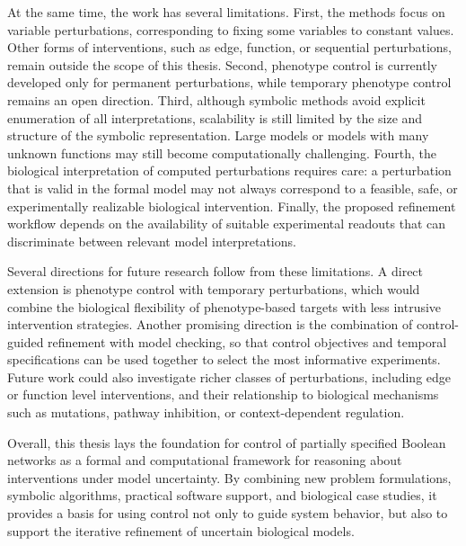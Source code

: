 At the same time, the work has several limitations. First, the methods focus
on variable perturbations, corresponding to fixing some variables to
constant values. Other forms of interventions, such as edge,
function, or sequential perturbations, remain outside the
scope of this thesis. Second, phenotype control is currently developed only
for permanent perturbations, while temporary phenotype control remains an
open direction. Third, although symbolic methods avoid explicit enumeration
of all interpretations, scalability is still limited by the size and structure of
the symbolic representation. Large models or models with many unknown
functions may still become computationally challenging. Fourth, the
biological interpretation of computed perturbations requires care: a
perturbation that is valid in the formal model may not always correspond to
a feasible, safe, or experimentally realizable biological intervention. Finally,
the proposed refinement workflow depends on the availability of suitable
experimental readouts that can discriminate between relevant model
interpretations.

Several directions for future research follow from these limitations. A direct
extension is phenotype control with temporary perturbations, which would
combine the biological flexibility of phenotype-based targets with less
intrusive intervention strategies. Another promising direction is the
combination of control-guided refinement with model checking, so that
control objectives and temporal specifications can be used together to select
the most informative experiments. Future work could also investigate richer
classes of perturbations, including edge or function level interventions, and
their relationship to biological mechanisms such as mutations, pathway
inhibition, or context-dependent regulation.

Overall, this thesis lays the foundation for control of partially specified Boolean networks
as a formal and computational framework for reasoning about interventions
under model uncertainty. By combining new problem formulations, symbolic
algorithms, practical software support, and biological case studies, it provides
a basis for using control not only to guide system behavior, but also to support
the iterative refinement of uncertain biological models.


\cleardoublepage


